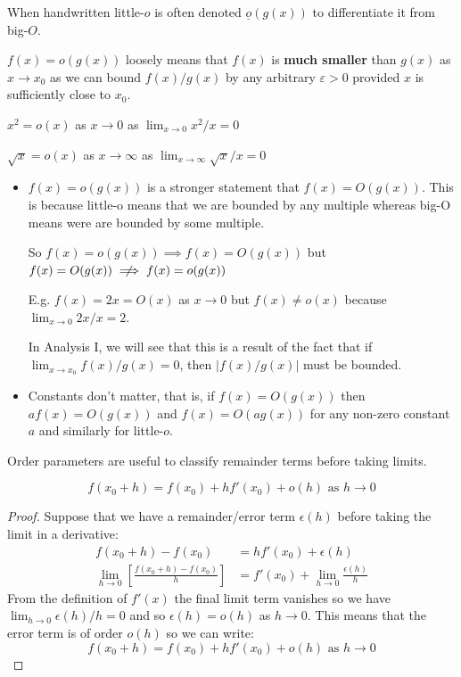 \documentclass[../main.tex]{subfiles}
\begin{document}
\begin{remark}[Notation]
  When handwritten little-$o$ is often denoted $\underline{o}(g(x))$ to differentiate it from big-$O$.
\end{remark}

$f(x) = o(g(x))$ loosely means that $f(x)$ is \textbf{much smaller} than $g(x)$ as $x \to x_0$ as we can bound $f(x)/g(x)$ by any arbitrary $\varepsilon > 0$ provided $x$ is sufficiently close to $x_0$.
\begin{example}
 $x^2 = o(x)$ as $x \to 0$ as $\lim_{x \to 0} x^2/x = 0$
\end{example}
\begin{example}
  $\sqrt{x} = o(x)$ as $x \to \infty$ as $\lim_{x \to \infty} \sqrt{x}/x = 0$
\end{example}
\begin{remark}[Notes]
  \begin{itemize}
    \item $f(x) = o(g(x))$ is a stronger statement that $f(x) = O(g(x))$.
      This is because little-o means that we are bounded by any multiple whereas big-O means were are bounded by some multiple.

      So $f(x) = o(g(x)) \implies f(x) = O(g(x))$ but $f(x) = O(g(x)) \centernot\implies f(x) = o(g(x))$

      E.g. $f(x) = 2x = O(x)$ as $x \to 0$ but $f(x) \neq o(x)$ because $\lim_{x \to 0} 2x/x = 2$.

      In Analysis I, we will see that this is a result of the fact that if $\lim_{x \to x_0} f(x)/g(x) = 0$, then $|f(x)/g(x)|$ must be bounded.
    \item Constants don't matter, that is, if $f(x) = O(g(x))$ then $af(x) = O(g(x))$ and $f(x) = O(ag(x))$ for any non-zero constant $a$ and similarly for little-$o$.
  \end{itemize}
\end{remark}
Order parameters are useful to classify remainder terms before taking limits.
\begin{proposition}
  \[
    f(x_0 + h) = f(x_0) + hf'(x_0) + o(h) \text{ as } h\to0
    \label{derivLittle}
  \]
\end{proposition}
\begin{proof}
  Suppose that we have a remainder/error term $\epsilon(h)$ before taking the limit in a derivative:
  \begin{align*}
    f(x_0 + h) - f(x_0) &= hf'(x_0) + \epsilon(h) \\
    \lim_{h \to 0} \left[\frac{f(x_0 + h) - f(x_0)}{h}\right] &= f'(x_0) + \lim_{h \to 0} \frac{\epsilon(h)}{h}
  \end{align*}
  From the definition of $f'(x)$ the final limit term vanishes so we have $\lim_{h \to 0} \epsilon(h)/h = 0$ and so $\epsilon(h) = o(h)$ as $h\to0$.
  This means that the error term is of order $o(h)$ so we can write:
  \[
    f(x_0 + h) = f(x_0) + hf'(x_0) + o(h) \text{ as } h\to0
  \]
\end{proof}
\end{document}
